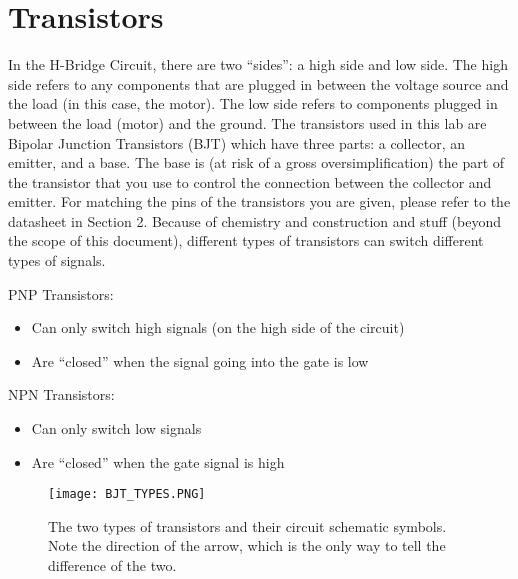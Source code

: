 \documentclass{article}
\begin{document}
\section{Transistors}
In the H-Bridge Circuit, there are two “sides”: a high side and low side. The high side refers to any components that are plugged in between the voltage source and the load (in this case, the motor). The low side refers to components plugged in between the load (motor) and the ground. The transistors used in this lab are Bipolar Junction Transistors (BJT) which have three parts: a collector, an emitter, and a base. The base is (at risk of a gross oversimplification) the part of the transistor that you use to control the connection between the collector and emitter. For matching the pins of the transistors you are given, please refer to the datasheet in Section 2.
Because of chemistry and construction and stuff (beyond the scope of this document), different types of transistors can switch different types of signals. 

PNP Transistors: 
\begin{itemize}
    \item Can only switch high signals (on the high side of the circuit) 
    \item Are “closed” when the signal going into the gate is low
\end{itemize}

NPN Transistors:
\begin{itemize}
    \item Can only switch low signals
    \item Are “closed” when the gate signal is high
\end{itemize}

\begin{figure}[ht]
	\center
	\texttt{[image: BJT\_TYPES.PNG]}
	\caption{The two types of transistors and their circuit schematic symbols. Note the direction of the arrow, which is the only way to tell the difference of the two.}
	\label{fig:transistor}
\end{figure}
\end{document}
